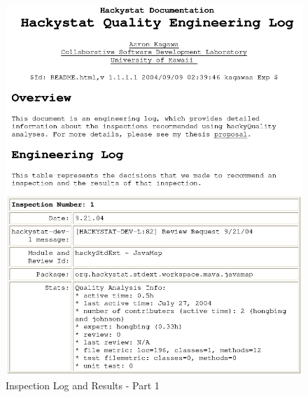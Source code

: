 
\begin{figure}[htbp]
  \centering
  \includegraphics[width=1.0\textwidth]{figs/engineeringlog_word_html_1.eps}
  \caption{Inspection Log and Results - Part 1}
  \label{fig:log1}
\end{figure}

